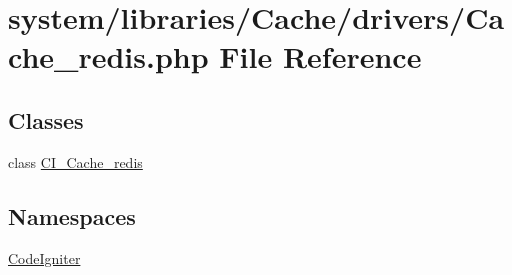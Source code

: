 \hypertarget{_cache__redis_8php}{}\section{system/libraries/\+Cache/drivers/\+Cache\+\_\+redis.php File Reference}
\label{_cache__redis_8php}
\subsection*{Classes}
\begin{DoxyCompactItemize}
\item 
class \mbox{\hyperlink{class_c_i___cache__redis}{C\+I\+\_\+\+Cache\+\_\+redis}}
\end{DoxyCompactItemize}
\subsection*{Namespaces}
\begin{DoxyCompactItemize}
\item 
 \mbox{\hyperlink{namespace_code_igniter}{Code\+Igniter}}
\end{DoxyCompactItemize}

